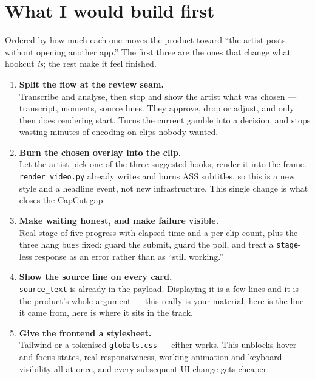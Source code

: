 \documentclass[11pt,a4paper]{article}
\newcommand{\code}[1]{\texttt{\small #1}}
\begin{document}
\section{What I would build first}

Ordered by how much each one moves the product toward ``the artist posts without
opening another app.'' The first three are the ones that change what hookcut
\emph{is}; the rest make it feel finished.

\begin{enumerate}
\item \textbf{Split the flow at the review seam.}\\
      \small\color{ink2}
      Transcribe and analyse, then stop and show the artist what was chosen ---
      transcript, moments, source lines. They approve, drop or adjust, and only
      then does rendering start. Turns the current gamble into a decision, and
      stops wasting minutes of encoding on clips nobody wanted.

\item \textbf{Burn the chosen overlay into the clip.}\\
      \small\color{ink2}
      Let the artist pick one of the three suggested hooks; render it into the
      frame. \code{render\_video.py} already writes and burns ASS subtitles, so
      this is a new style and a headline event, not new infrastructure. This
      single change is what closes the CapCut gap.

\item \textbf{Make waiting honest, and make failure visible.}\\
      \small\color{ink2}
      Real stage-of-five progress with elapsed time and a per-clip count, plus
      the three hang bugs fixed: guard the submit, guard the poll, and treat a
      \code{stage}-less response as an error rather than as ``still working.''

\item \textbf{Show the source line on every card.}\\
      \small\color{ink2}
      \code{source\_text} is already in the payload. Displaying it is a few
      lines and it is the product's whole argument --- this really is your
      material, here is the line it came from, here is where it sits in the
      track.

\item \textbf{Give the frontend a stylesheet.}\\
      \small\color{ink2}
      Tailwind or a tokenised \code{globals.css} --- either works. This unblocks
      hover and focus states, real responsiveness, working animation and
      keyboard visibility all at once, and every subsequent UI change gets
      cheaper.


\end{enumerate}
\end{document}

